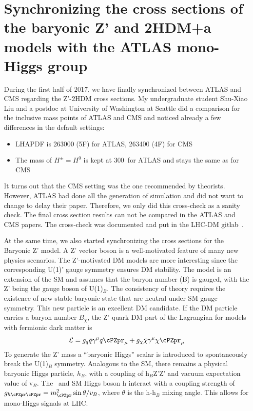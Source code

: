 \section{Synchronizing the cross sections of the baryonic Z’ and 2HDM+a models with the ATLAS mono-Higgs group}

During the first half of 2017, we have finally synchronized between ATLAS and CMS regarding the Z'-2HDM cross sections. My undergraduate student Shu-Xiao Liu and a postdoc at University of Washington at Seattle did a comparison for the inclusive mass points of ATLAS and CMS and noticed already a few differences in the default settings:
\begin{itemize}
 \item LHAPDF is 263000 (5F) for ATLAS, 263400 (4F) for CMS
 \item The mass of $H^{\pm}=H^0$ is kept at 300~\GeV for ATLAS and stays the same as \maz for CMS 
\end{itemize}
It turns out that the CMS setting was the one recommended by theorists. However, ATLAS had done all the generation of simulation and did not want to change to delay their paper. Therefore, we only did this cross-check as a sanity check. The final cross section results can not be compared in the ATLAS and CMS papers.
The cross-check was documented and put in the LHC-DM gitlab~\cite{shuxiao}.

At the same time, we also started synchronizing the cross sections for the Baryonic Z' model. 
A Z' vector boson is a well-motivated feature of many new physics scenarios. 
The Z'-motivated DM models are more interesting since the corresponding U(1)' 
gauge symmetry ensures DM stability. The model is an extension of the SM and 
assumes that the baryon number (B) is gauged, with the Z' being the gauge 
boson of U(1)$_{B}$. The consistency of theory requires the existence of new 
stable baryonic state that are neutral under SM gauge symmetry. This new 
particle is an excellent DM candidate. If the DM particle carries a baryon 
number $B_{\chi}$, the Z'-quark-DM part of the Lagrangian for models with 
fermionic dark matter is 
\begin{equation}
{\cal L} = g_q \bar{q}\gamma^{\mu}q\cPZpr_{\mu}+g_{\chi}\bar{\chi}\gamma^{\mu}\chi\cPZpr_{\mu}
\end{equation}
To generate the Z' mass a ``baryonic Higgs'' scalar is introduced to 
spontaneously break the U(1)$_B$ symmetry. Analogous to the SM, there remains 
a physical baryonic Higgs particle, $h_{B}$, with a coupling of h$_{B}$Z'Z' 
and vacuum expectation value of v$_{B}$. 
The \cPZpr\ and SM Higgs boson h interact with a coupling strength of 
$g_{h\cPZpr\cPZpr} = m_{\cPZpr}^{2} \sin \theta/v_{B}$, where $\theta$ is the h-h$_{B}$ 
mixing angle. This allows for mono-Higgs signals at LHC. 


